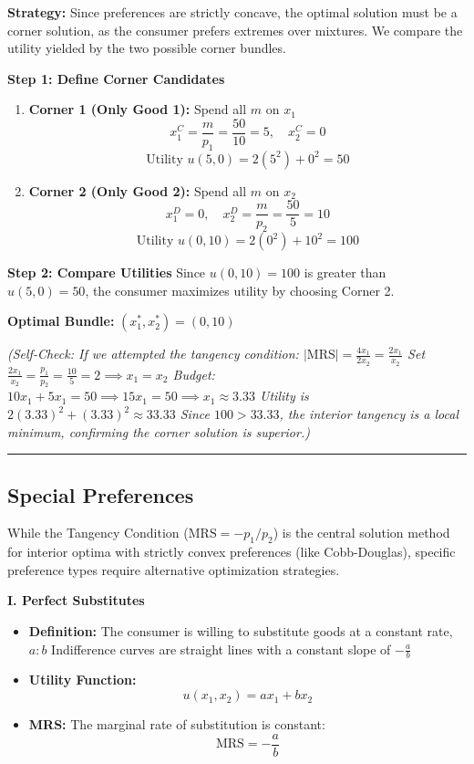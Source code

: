 \documentclass{article}
\begin{document}
\textbf{Strategy:} Since preferences are strictly concave, the optimal solution must be a corner solution, as the consumer prefers extremes over mixtures. We compare the utility yielded by the two possible corner bundles.

\textbf{Step 1: Define Corner Candidates}
\begin{enumerate}
    \item \textbf{Corner 1 (Only Good 1):} Spend all $m$ on $x_1$
    \[ x_1^C = \frac{m}{p_1} = \frac{50}{10} = 5, \quad x_2^C = 0 \]
    \[ \text{Utility } u(5, 0) = 2(5^2) + 0^2 = 50 \]
    \item \textbf{Corner 2 (Only Good 2):} Spend all $m$ on $x_2$
    \[ x_1^D = 0, \quad x_2^D = \frac{m}{p_2} = \frac{50}{5} = 10 \]
    \[ \text{Utility } u(0, 10) = 2(0^2) + 10^2 = 100 \]
\end{enumerate}

\textbf{Step 2: Compare Utilities} Since $u(0, 10) = 100$ is greater than $u(5, 0) = 50$, the consumer maximizes utility by choosing Corner 2.

\textbf{Optimal Bundle:} $(x_1^*, x_2^*) = (0, 10)$

\textit{(Self-Check: If we attempted the tangency condition: $|\text{MRS}| = \frac{4x_1}{2x_2} = \frac{2x_1}{x_2}$ Set $\frac{2x_1}{x_2} = \frac{p_1}{p_2} = \frac{10}{5} = 2 \implies x_1 = x_2$ Budget: $10x_1 + 5x_1 = 50 \implies 15x_1 = 50 \implies x_1 \approx 3.33$ Utility is $2(3.33)^2 + (3.33)^2 \approx 33.33$ Since $100 > 33.33$, the interior tangency is a local minimum, confirming the corner solution is superior.)}

\noindent\rule{\linewidth}{0.4pt}

\subsection{Special Preferences}

While the Tangency Condition ($\text{MRS} = -p_1/p_2$) is the central solution method for interior optima with strictly convex preferences (like Cobb-Douglas), specific preference types require alternative optimization strategies.

\noindent\textbf{I. Perfect Substitutes}
\begin{itemize}
    \item \textbf{Definition:} The consumer is willing to substitute goods at a constant rate, $a:b$ Indifference curves are straight lines with a constant slope of $-\frac{a}{b}$
    \item \textbf{Utility Function:} \[u(x_1, x_2) = a x_1 + b x_2\]
    \item \textbf{MRS:} The marginal rate of substitution is constant: \[\text{MRS} = -\frac{a}{b}\]
\end{itemize}
\end{document}
